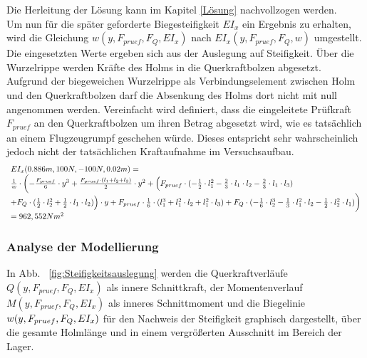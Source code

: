 Die Herleitung der Lösung kann im Kapitel \ref{Lösung} nachvollzogen werden.\\

\noindent Um nun für die später geforderte Biegesteifigkeit $EI_{x}$ ein Ergebnis zu erhalten, wird die Gleichung $w(y,F_{pruef},F_{Q}, EI_{x})$ nach $EI_{x}(y,F_{pruef},F_{Q},w)$ umgestellt. Die eingesetzten Werte ergeben sich aus der Auslegung auf Steifigkeit. Über die Wurzelrippe werden Kräfte des Holms in die Querkraftbolzen abgesetzt. Aufgrund der biegeweichen Wurzelrippe als Verbindungselement zwischen Holm und den Querkraftbolzen darf die Absenkung des Holms dort nicht mit null angenommen werden. Vereinfacht wird definiert, dass die eingeleitete Prüfkraft $F_{pruef}$ an den Querkraftbolzen um ihren Betrag abgesetzt wird, wie es tatsächlich an einem Flugzeugrumpf geschehen würde. Dieses entspricht sehr wahrscheinlich jedoch nicht der tatsächlichen Kraftaufnahme im Versuchsaufbau.
\begin{equation}
	\begin{array}{l}
		EI_{x}(0.886m, 100N, -100N, 0.02m)= \\
		\frac{1}{w}\cdot\biggl(-\frac{F_{pruef}}{6}\cdot y^{3} + \frac{ F_{pruef}\cdot (l_{1}+l_{2}+l_{3})}{2}\cdot y^{2} + \Bigl(F_{pruef}\cdot(-\frac{1}{2}\cdot l_{1}^{2} -\frac{2}{3}\cdot l_{1}\cdot l_{2}-\frac{2}{3}\cdot l_{1}\cdot l_{3}) \\ +F_{Q}\cdot(\frac{1}{2}\cdot l_{2}^{2}+\frac{1}{2}\cdot l_{1}\cdot l_{2})\Bigr)\cdot y + F_{pruef}\cdot\frac{1}{6}\cdot(l_{1}^{3}+l_{1}^{2}\cdot l_{2}+l_{1}^{2}\cdot l_{3}) + F_{Q}\cdot(-\frac{1}{6}\cdot l_{2}^{3}-\frac{1}{3}\cdot l_{1}^{2}\cdot l_{2}-\frac{1}{2}\cdot l_{2}^{2}\cdot l_{1})\biggr)\\
		=962,552Nm^{2}
	\end{array}
\end{equation}

\subsubsection{Analyse der Modellierung}
In Abb. ~\ref{fig:Steifigkeitsauslegung} werden die Querkraftverläufe $Q(y,F_{pruef},F_{Q},EI_{x})$ als innere Schnittkraft, der Momentenverlauf $M(y,F_{pruef},F_{Q},EI_{x})$ als inneres Schnittmoment und die Biegelinie $w(y,F_{pruef},F_{Q},\\EI_{x})$ für den Nachweis der Steifigkeit graphisch dargestellt, über die gesamte Holmlänge und in einem vergrößerten Ausschnitt im Bereich der Lager. \\

